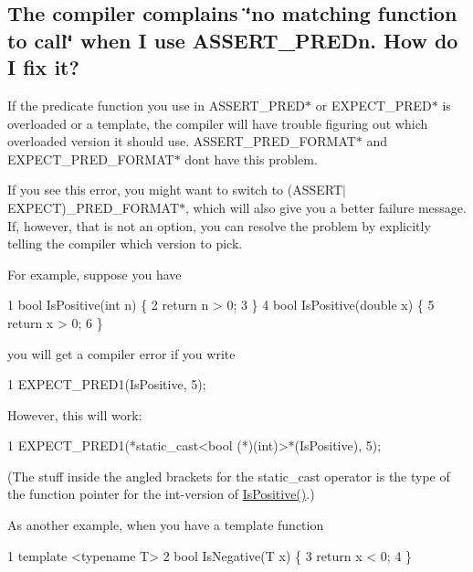 \subsection*{The compiler complains \char`\"{}no matching function to call\char`\"{} when I use A\+S\+S\+E\+R\+T\+\_\+\+P\+R\+E\+Dn. How do I fix it?}

If the predicate function you use in {\ttfamily A\+S\+S\+E\+R\+T\+\_\+\+P\+R\+E\+D$\ast$} or {\ttfamily E\+X\+P\+E\+C\+T\+\_\+\+P\+R\+E\+D$\ast$} is overloaded or a template, the compiler will have trouble figuring out which overloaded version it should use. {\ttfamily A\+S\+S\+E\+R\+T\+\_\+\+P\+R\+E\+D\+\_\+\+F\+O\+R\+M\+A\+T$\ast$} and {\ttfamily E\+X\+P\+E\+C\+T\+\_\+\+P\+R\+E\+D\+\_\+\+F\+O\+R\+M\+A\+T$\ast$} don\textquotesingle{}t have this problem.

If you see this error, you might want to switch to {\ttfamily (A\+S\+S\+E\+R\+T$\vert$\+E\+X\+P\+E\+CT)\+\_\+\+P\+R\+E\+D\+\_\+\+F\+O\+R\+M\+A\+T$\ast$}, which will also give you a better failure message. If, however, that is not an option, you can resolve the problem by explicitly telling the compiler which version to pick.

For example, suppose you have


\begin{DoxyCode}
1 bool IsPositive(int n) \{
2   return n > 0;
3 \}
4 bool IsPositive(double x) \{
5   return x > 0;
6 \}
\end{DoxyCode}


you will get a compiler error if you write


\begin{DoxyCode}
1 EXPECT\_PRED1(IsPositive, 5);
\end{DoxyCode}


However, this will work\+:


\begin{DoxyCode}
1 EXPECT\_PRED1(*static\_cast<bool (*)(int)>*(IsPositive), 5);
\end{DoxyCode}


(The stuff inside the angled brackets for the {\ttfamily static\+\_\+cast} operator is the type of the function pointer for the {\ttfamily int}-\/version of {\ttfamily \hyperlink{namespacetesting_1_1gmock__matchers__test_a70e728cf67d0224c3ebb9eb8959cc39d}{Is\+Positive()}}.)

As another example, when you have a template function


\begin{DoxyCode}
1 template <typename T>
2 bool IsNegative(T x) \{
3   return x < 0;
4 \}
\end{DoxyCode}


